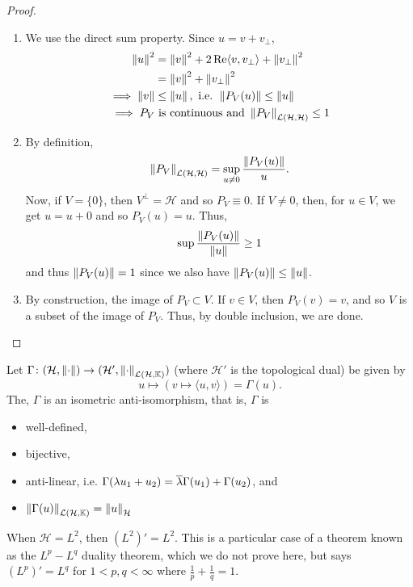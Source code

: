\documentclass[11pt,leqno,oneside]{amsbook}
\numberwithin{thm}{section}
\newcommand{\cL}{\mathcal{L}}
\newcommand{\K}{\mathbb{K}} %
\renewcommand{\H}{\mathcal{H}} %
\begin{document}
\begin{proof}
  \begin{enumerate}
  \item We use the direct sum property. Since \(u = v + v_\perp\),
    \begin{align*}
      \norm[u]^2 & = \norm[v]^2 + 2 \Re \langle v,v_\perp \rangle +
                   \norm[v_\perp]^2 \\
                 & = \norm[v]^2 + \norm[v_\perp]^2 \\
      \implies \norm[v] & \leq \norm[u], \text{ i.e. } \norm[P_V(u)] \leq
      \norm[u] \\
      \implies P_V & \text{ is continuous and } \norm[P_V]_{\cL(\H,\H)}
      \leq 1
    \end{align*}
  \item By definition, \[
      \norm[P_V]_{\cL(\H,\H)} = \sup_{u \neq 0} \frac{\norm[P_V(u)]}{u}.
    \]
    Now, if \(V = \{0\}\), then \(V^\perp = \H\) and so \(P_V \equiv
    0\). If \(V \neq 0\), then, for \(u \in V\), we get \(u = u + 0\)
    and so \(P_V(u) = u\). Thus, \[
      \sup \frac{\norm[P_V(u)]}{\norm[u]} \geq 1
    \]
    and thus \(\norm[P_V(u)] = 1\) since we also have \(\norm[P_V(u)] \leq
    \norm[u]\).
  \item By construction, the image of \(P_V \subset V\). If \(v \in
    V\), then \(P_V(v) = v\), and so \(V\) is a subset of the image of
    \(P_V\). Thus, by double inclusion, we are done.
  \end{enumerate}
\end{proof}
\begin{thm}
  Let \(\Gamma \from (\H,\norm) \to (\H',\norm_{\cL(\H,\K)})\) (where
  \(\H'\) is the topological dual) be
  given by \[
    u \mapsto (v \mapsto \langle u,v \rangle) = \Gamma(u).
  \]
  The, \(\Gamma\) is an isometric anti-isomorphism, that is,
  \(\Gamma\) is
  \begin{itemize}
  \item well-defined,
  \item bijective,
  \item anti-linear, i.e. \(\Gamma(\lambda u_1 + u_2) = \ov{\lambda}
    \Gamma(u_1) + \Gamma(u_2)\), and
  \item \(\norm[\Gamma(u)]_{\cL(\H,\K)} = \norm[u]_\H\)
  \end{itemize}
\end{thm}
\begin{rmk}
  When \(\H = L^2\), then \((L^2)' = L^2\). This is a particular case
  of a theorem known as the \(L^p-L^q\) duality theorem, which we do
  not prove here, but says \((L^p)' = L^q\) for \(1 < p,q < \infty\)
  where \(\frac{1}{p}+\frac{1}{q} = 1\).
\end{rmk}
\end{document}
